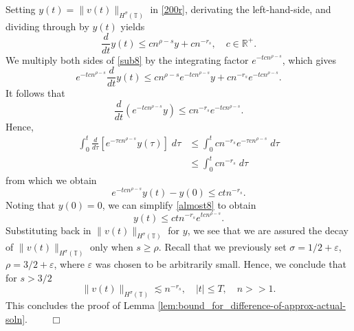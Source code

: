 \documentclass[12pt,reqno]{amsart}
\newcommand{\rr}{\mathbb{R}}
\newcommand{\ci}{\mathbb{T}}
\newcommand{\ee}{\varepsilon}
\theoremstyle{plain}  %
\theoremstyle{definition}
\begin{document}
Setting $y(t) = \|v(t)\|_{H^\sigma(\ci)}$  in \eqref{200r}, derivating the
left-hand-side, and dividing through by $y(t)$ yields
\begin{equation}
	\label{sub8}
	\frac{d}{dt} y(t) \le cn^{\rho - s}y + cn^{-r_s}, \quad c\in \rr^{+}.
\end{equation}
We multiply both sides of \eqref{sub8} by the integrating factor $e^{-tcn^{\rho - s}}$,
which gives
\begin{equation*}
	e^{-tcn^{\rho - s}}\frac{d}{dt} y(t) \le cn^{\rho - s} e^{-tcn^{\rho - s}}y
	+ cn^{-r_s}e^{-tcn^{\rho - s}}.
\end{equation*}
It follows that
\begin{equation*}
	\frac{d}{dt}\left (e^{-tcn^{\rho - s}} y \right ) \le cn^{-r_s}e^{-tcn^{\rho - s}} .
\end{equation*}
Hence,
\begin{equation*}
	\begin{split}
	\int_0^t  \frac{d}{d \tau} \left[ e^{-\tau cn^{\rho - s}} y(\tau)
	\right] \; d \tau
	& \le \int_0^t  c n^{-r_s} e^{-\tau cn^{\rho - s}}  \; d \tau
	\\
	& \le \int_0^t cn^{-r_s} \; d \tau
\end{split}
\end{equation*}
from which we obtain
\begin{equation}
	\label{almost8}
	e^{-tcn^{\rho - s}} y(t) - y(0) \le ctn^{-r_s}.
\end{equation}
Noting that $y(0)=0$, we can simplify \eqref{almost8} to obtain
\begin{equation}
	\label{gronwall-ineq8}
	y(t) \le ctn^{-r_s} e^{tcn^{\rho - s}}.
\end{equation}
Substituting back in $\|v(t)\|_{H^\sigma(\ci)}$ for $y$, we see that we are assured the
decay of $\|v(t)\|_{H^\sigma(\ci)}$ only when $s \ge \rho$. Recall that
we previously set $\sigma = 1/2 + \ee$, $\rho = 3/2 + \ee$, where $\ee$ was
chosen to be arbitrarily small. Hence, we conclude that for $s>3/2$
\begin{equation}
	\label{en-est-fin!8}
	\|v(t)\|_{H^\sigma(\ci)} 
	\lesssim
	n^{-r_s}, \quad |t| \le T,\quad n>>1 . 
\end{equation}
This concludes the proof of Lemma
\ref{lem:bound_for_difference-of-approx-actual-soln}. $\qquad \Box$
\end{document}
